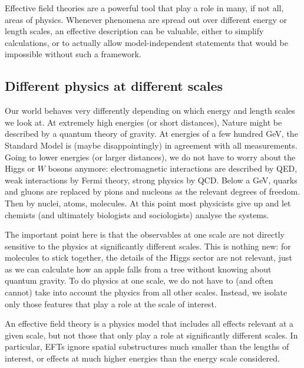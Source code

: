 Effective field theories are a powerful tool that play a role in many,
if not all, areas of physics. Whenever phenomena are spread out over
different energy or length scales, an effective description can be
valuable, either to simplify calculations, or to actually allow
model-independent statements that would be impossible without such a
framework.



\subsection{Different physics at different scales}
\label{sec:foundations_scales}

Our world behaves very differently depending on which energy and
length scales we look at. At extremely high energies (or short
distances), Nature might be described by a quantum theory of
gravity. At energies of a few hundred GeV, the Standard Model is
(maybe disappointingly) in agreement with all measurements. Going to lower
energies (or larger distances), we do not have to worry about the Higgs or
$W$ bosons anymore: electromagnetic interactions are described by QED,
weak interactions by Fermi theory, strong physics by QCD. Below a GeV,
quarks and gluons are replaced by pions and nucleons as the relevant
degrees of freedom. Then by nuclei, atoms, molecules. At this point
most physicists give up and let chemists (and ultimately biologists
and sociologists) analyse the systems.

The important point here is that the observables at one scale are not
directly sensitive to the physics at significantly different
scales. This is nothing new: for molecules to stick together, the
details of the Higgs sector are not relevant, just as we can calculate how
an apple falls from a tree without knowing about quantum gravity. To
do physics at one scale, we do not have to (and often cannot) take
into account the physics from all other scales. Instead, we isolate
only those features that play a role at the scale of interest.

An effective field theory is a physics model that includes all effects
relevant at a given scale, but not those that only play a role at
significantly different scales. In particular, EFTs ignore spatial
substructures much smaller than the lengths of interest, or effects at
much higher energies than the energy scale considered.


